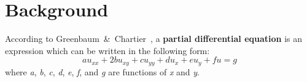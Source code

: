 \documentclass[12pt, titlepage]{article}
\title{\mytitle}
\author{Jaden Nola}
\date{2 May 2023}
\begin{document}
    \maketitle
    \section*{Background} 
    According to Greenbaum~\&~Chartier~\cite{greenbaum}, a \textbf{partial differential equation} is an expression which can be written
    in the following form:
    \begin{equation}
        au_{xx} + 2bu_{xy} + cu_{yy} + du_{x} + eu_{y} + fu = g
    \end{equation}
    where \textit{a}, \textit{b}, \textit{c}, \textit{d}, \textit{e}, \textit{f}, and \textit{g} are functions of \textit{x} and \textit{y}.
    \newpage 
    
    {}
\end{document}
